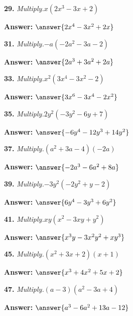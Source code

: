 \documentclass{ximera}
\begin{document}
\begin{problem}
\textbf{29.} \emph{Multiply.}\quad $x(2x^3 - 3x + 2)$

\textbf{Answer:} $\answer{2x^4 -3x^2 +2x}$
\end{problem}

\begin{problem}
\textbf{31.} \emph{Multiply.}\quad $-a(-2a^2 - 3a - 2)$

\textbf{Answer:} $\answer{2a^3 +3a^2 +2a}$
\end{problem}

\begin{problem}
\textbf{33.} \emph{Multiply.}\quad $x^2(3x^4 - 3x^2 - 2)$

\textbf{Answer:} $\answer{3x^6 -3x^4 -2x^2}$
\end{problem}

\begin{problem}
\textbf{35.} \emph{Multiply.}\quad $2y^2(-3y^2 - 6y + 7)$

\textbf{Answer:} $\answer{-6y^4 -12y^3 +14y^2}$
\end{problem}

\begin{problem}
\textbf{37.} \emph{Multiply.}\quad $(a^2 + 3a - 4)(-2a)$

\textbf{Answer:} $\answer{-2a^3 -6a^2 +8a}$
\end{problem}

\begin{problem}
\textbf{39.} \emph{Multiply.}\quad $-3y^2(-2y^2 + y - 2)$

\textbf{Answer:} $\answer{6y^4 -3y^3 +6y^2}$
\end{problem}

\begin{problem}
\textbf{41.} \emph{Multiply.}\quad $xy(x^2 - 3xy + y^2)$

\textbf{Answer:} $\answer{x^3y -3x^2y^2 +xy^3}$
\end{problem}

\begin{problem}
\textbf{45.} \emph{Multiply.}\quad $(x^2 + 3x + 2)(x + 1)$

\textbf{Answer:} $\answer{x^3 +4x^2 +5x +2}$
\end{problem}

\begin{problem}
\textbf{47.} \emph{Multiply.}\quad $(a - 3)(a^2 - 3a + 4)$

\textbf{Answer:} $\answer{a^3 -6a^2 +13a -12}$
\end{problem}
\end{document}
